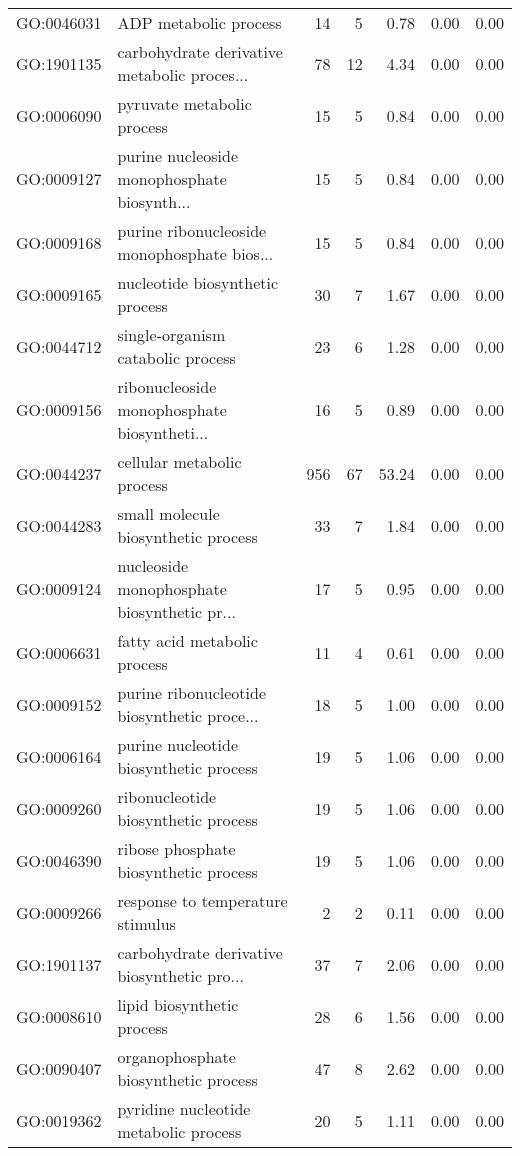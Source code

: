 \begin{table}[ht]
\begin{tabular}{llrrrrr}
  GO:0046031 & ADP metabolic process &  14 &   5 & 0.78 & 0.00 & 0.00 \\ 
  GO:1901135 & carbohydrate derivative metabolic proces... &  78 &  12 & 4.34 & 0.00 & 0.00 \\ 
  GO:0006090 & pyruvate metabolic process &  15 &   5 & 0.84 & 0.00 & 0.00 \\ 
  GO:0009127 & purine nucleoside monophosphate biosynth... &  15 &   5 & 0.84 & 0.00 & 0.00 \\ 
  GO:0009168 & purine ribonucleoside monophosphate bios... &  15 &   5 & 0.84 & 0.00 & 0.00 \\ 
  GO:0009165 & nucleotide biosynthetic process &  30 &   7 & 1.67 & 0.00 & 0.00 \\ 
  GO:0044712 & single-organism catabolic process &  23 &   6 & 1.28 & 0.00 & 0.00 \\ 
  GO:0009156 & ribonucleoside monophosphate biosyntheti... &  16 &   5 & 0.89 & 0.00 & 0.00 \\ 
  GO:0044237 & cellular metabolic process & 956 &  67 & 53.24 & 0.00 & 0.00 \\ 
  GO:0044283 & small molecule biosynthetic process &  33 &   7 & 1.84 & 0.00 & 0.00 \\ 
  GO:0009124 & nucleoside monophosphate biosynthetic pr... &  17 &   5 & 0.95 & 0.00 & 0.00 \\ 
  GO:0006631 & fatty acid metabolic process &  11 &   4 & 0.61 & 0.00 & 0.00 \\ 
  GO:0009152 & purine ribonucleotide biosynthetic proce... &  18 &   5 & 1.00 & 0.00 & 0.00 \\ 
  GO:0006164 & purine nucleotide biosynthetic process &  19 &   5 & 1.06 & 0.00 & 0.00 \\ 
  GO:0009260 & ribonucleotide biosynthetic process &  19 &   5 & 1.06 & 0.00 & 0.00 \\ 
  GO:0046390 & ribose phosphate biosynthetic process &  19 &   5 & 1.06 & 0.00 & 0.00 \\ 
  GO:0009266 & response to temperature stimulus &   2 &   2 & 0.11 & 0.00 & 0.00 \\ 
  GO:1901137 & carbohydrate derivative biosynthetic pro... &  37 &   7 & 2.06 & 0.00 & 0.00 \\ 
  GO:0008610 & lipid biosynthetic process &  28 &   6 & 1.56 & 0.00 & 0.00 \\ 
  GO:0090407 & organophosphate biosynthetic process &  47 &   8 & 2.62 & 0.00 & 0.00 \\ 
  GO:0019362 & pyridine nucleotide metabolic process &  20 &   5 & 1.11 & 0.00 & 0.00 \\ 

\end{tabular}
\end{table}
